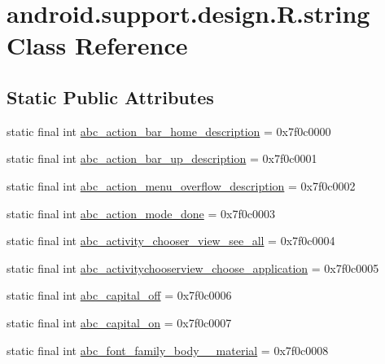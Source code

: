 \hypertarget{classandroid_1_1support_1_1design_1_1_r_1_1string}{}\section{android.\+support.\+design.\+R.\+string Class Reference}
\label{classandroid_1_1support_1_1design_1_1_r_1_1string}
\subsection*{Static Public Attributes}
\begin{DoxyCompactItemize}
\item 
static final int \mbox{\hyperlink{classandroid_1_1support_1_1design_1_1_r_1_1string_ae94186933fbea8b608ced5c610548d2e}{abc\+\_\+action\+\_\+bar\+\_\+home\+\_\+description}} = 0x7f0c0000
\item 
static final int \mbox{\hyperlink{classandroid_1_1support_1_1design_1_1_r_1_1string_a6879bf96dd0f053bc7b186fe5cc8fc3a}{abc\+\_\+action\+\_\+bar\+\_\+up\+\_\+description}} = 0x7f0c0001
\item 
static final int \mbox{\hyperlink{classandroid_1_1support_1_1design_1_1_r_1_1string_a0da53f31459d40d1c77cb1a7e89746cb}{abc\+\_\+action\+\_\+menu\+\_\+overflow\+\_\+description}} = 0x7f0c0002
\item 
static final int \mbox{\hyperlink{classandroid_1_1support_1_1design_1_1_r_1_1string_a650cb796af0ed2ed3305583ac1887224}{abc\+\_\+action\+\_\+mode\+\_\+done}} = 0x7f0c0003
\item 
static final int \mbox{\hyperlink{classandroid_1_1support_1_1design_1_1_r_1_1string_a9b4629898f289df4ea77edefdf9f011f}{abc\+\_\+activity\+\_\+chooser\+\_\+view\+\_\+see\+\_\+all}} = 0x7f0c0004
\item 
static final int \mbox{\hyperlink{classandroid_1_1support_1_1design_1_1_r_1_1string_a79f096c86588827bd6ad855469b5e54b}{abc\+\_\+activitychooserview\+\_\+choose\+\_\+application}} = 0x7f0c0005
\item 
static final int \mbox{\hyperlink{classandroid_1_1support_1_1design_1_1_r_1_1string_ad46592fba1fea78b0e19f3518fb6f4e2}{abc\+\_\+capital\+\_\+off}} = 0x7f0c0006
\item 
static final int \mbox{\hyperlink{classandroid_1_1support_1_1design_1_1_r_1_1string_a30323ab4c5b6d961b3b1befd438dc709}{abc\+\_\+capital\+\_\+on}} = 0x7f0c0007
\item 
static final int \mbox{\hyperlink{classandroid_1_1support_1_1design_1_1_r_1_1string_a106039ca637d01d0b52a7e9f5e1d279e}{abc\+\_\+font\+\_\+family\+\_\+body\+\_\+\_\+material}} = 0x7f0c0008

\end{DoxyCompactItemize}
